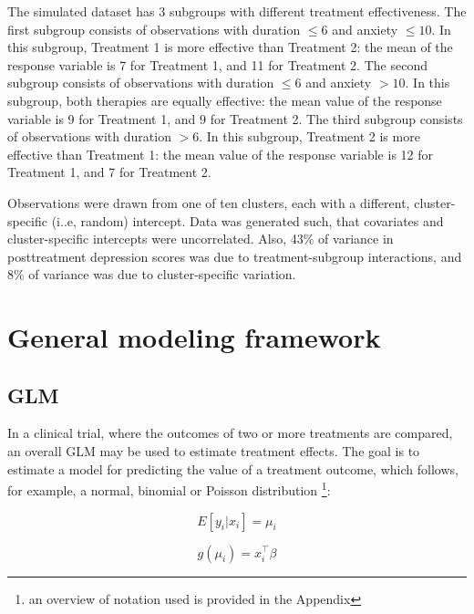 \documentclass[nobf,doc]{apa}
\begin{document}
The simulated dataset has 3 subgroups with different treatment effectiveness. The first subgroup consists of observations with duration $\leq 6$ and anxiety $\leq 10$. In this subgroup, Treatment 1 is more effective than Treatment 2: the mean of the response variable is 7 for Treatment 1, and 11 for Treatment 2. The second subgroup consists of observations with duration $\leq 6$ and anxiety $> 10$. In this subgroup, both therapies are equally effective: the mean value of the response variable is 9 for Treatment 1, and 9 for Treatment 2. The third subgroup consists of observations with duration $>6$. In this subgroup, Treatment 2 is more effective than Treatment 1: the mean value of the response variable is 12 for Treatment 1, and 7 for Treatment 2. 

Observations were drawn from one of ten clusters, each with a different, cluster-specific (i..e, random) intercept. Data was generated such, that covariates and cluster-specific intercepts were uncorrelated. Also, 43\% of variance in posttreatment depression scores was due to treatment-subgroup interactions, and 8\% of variance was due to cluster-specific variation. 




\section{General modeling framework}

\subsection{GLM}
In a clinical trial, where the outcomes of two or more treatments are compared, an overall GLM may be used to estimate treatment effects. The goal is to estimate a model for predicting the value of a treatment outcome, which follows, for example, a normal, binomial or Poisson distribution \footnote{ an overview of notation used is provided in the Appendix}:

\begin{equation}
\label{eq:expected_value}
	E[y_i | x_i] = \mu_i 
\end{equation}

\begin{equation}
\label{eq:fixedeffects}
	g(\mu_{i}) = x_{i}^{\top}\beta 
\end{equation}
\end{document}
